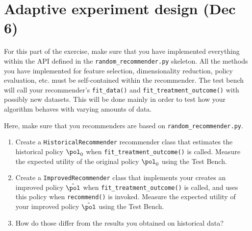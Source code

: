 \section{Adaptive experiment design (Dec 6)}
For this part of the exercise, make sure that you have implemented everything within the API defined in the \verb!random_recommender.py! skeleton. All the methods you have implemented for feature selection, dimensionality reduction, policy evaluation, etc. must be self-contained within the recommender. The test bench will call your recommender's \verb!fit_data()! and \verb!fit_treatment_outcome()! with possibly new datasets. This will be done mainly in order to test how your algorithm behaves with varying amounts of data.
\begin{exercise}
  Here, make sure that you recommenders are based on \verb!random_recommender.py!.
  \begin{enumerate}
  \item Create a \texttt{HistoricalRecommender} recommender class that estimates the historical policy $\pol_0$ when \verb!fit_treatment_outcome()! is called. Measure the expected utility of the original policy $\pol_0$ using the Test Bench.
  \item Create a \texttt{ImprovedRecommender} class that implements your creates an improved policy $\hat{\pol}$ when \verb!fit_treatment_outcome()! is called, and uses this policy when \verb!recommend()! is invoked. Measure the expected utility of your improved policy $\hat{\pol}$ using the Test Bench.
  \item How do those differ from the results you obtained on historical data?
  \end{enumerate}
\end{exercise}

